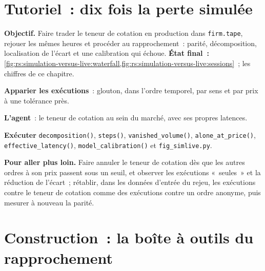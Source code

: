 \section{Tutoriel~: dix fois la perte simulée}\label{tut:rs:simulation-versus-live:tut}

\begin{tutorial}
\textbf{Objectif.} Faire trader le teneur de cotation en production dans \texttt{firm.tape}, rejouer les mêmes heures et procéder au rapprochement~: parité, décomposition, localisation de l'écart et une
calibration qui échoue. \textbf{État final~:} \cref{fig:rs:simulation-versus-live:waterfall,fig:rs:simulation-versus-live:sessions}~; les chiffres de ce chapitre.
\begin{tutsteps}
\item \textbf{Apparier les exécutions}~: glouton, dans l'ordre temporel, par sens et par prix à une tolérance près.
\label{lst:rs:simulation-versus-live:match}
\item \textbf{L'agent}~: le teneur de cotation au sein du marché, avec ses propres latences.
\label{lst:rs:simulation-versus-live:agent}
\item \textbf{Exécuter} \texttt{decomposition()}, \texttt{steps()}, \texttt{vanished\_volume()}, \texttt{alone\_at\_price()}, \texttt{effective\_latency()},
\texttt{model\_calibration()} et \texttt{fig\_simlive.py}.
\end{tutsteps}
\textbf{Pour aller plus loin.} Faire annuler le teneur de cotation dès que les autres ordres à son prix passent sous un seuil, et observer les exécutions «~seules~» et la réduction de l'écart~;
rétablir, dans les données d'entrée du rejeu, les exécutions contre le teneur de cotation comme des exécutions contre un ordre anonyme, puis mesurer à nouveau la parité.
\end{tutorial}

\section{Construction~: la boîte à outils du rapprochement}\label{bld:rs:simulation-versus-live:simlive}

